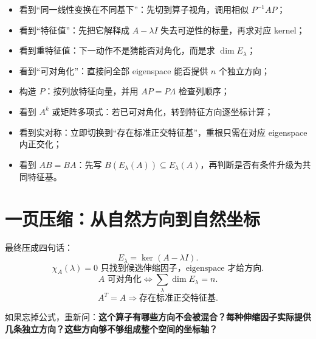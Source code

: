 \documentclass[11pt,a4paper]{ctexart}
\newcommand{\kw}[1]{\textbf{\color{deep}#1}}
\begin{document}
\begin{itemize}
  \item 看到“同一线性变换在不同基下”：先切到算子视角，调用相似 $P^{-1}AP$；
  \item 看到“特征值”：先把它解释成 $A-\lambda I$ 失去可逆性的标量，再求对应 kernel；
  \item 看到重特征值：下一动作不是猜能否对角化，而是求 $\dim E_\lambda$；
  \item 看到“可对角化”：直接问全部 eigenspace 能否提供 $n$ 个独立方向；
  \item 构造 $P$：按列放特征向量，并用 $AP=P\Lambda$ 检查列顺序；
  \item 看到 $A^k$ 或矩阵多项式：若已可对角化，转到特征方向逐坐标计算；
  \item 看到实对称：立即切换到“存在标准正交特征基”，重根只需在对应 eigenspace 内正交化；
  \item 看到 $AB=BA$：先写 $B(E_\lambda(A))\subseteq E_\lambda(A)$，再判断是否有条件升级为共同特征基。
\end{itemize}

\section{一页压缩：从自然方向到自然坐标}

\begin{center}
\end{center}

最终压成四句话：
\[
\boxed{E_\lambda=\ker(A-\lambda I).}
\]
\[
\boxed{\chi_A(\lambda)=0\text{ 只找到候选伸缩因子，eigenspace 才给方向}.}
\]
\[
\boxed{A\text{ 可对角化}\iff\sum_\lambda\dim E_\lambda=n.}
\]
\[
\boxed{A^T=A\Longrightarrow\text{存在标准正交特征基}.}
\]

如果忘掉公式，重新问：\kw{这个算子有哪些方向不会被混合？每种伸缩因子实际提供几条独立方向？这些方向够不够组成整个空间的坐标轴？}
\end{document}
